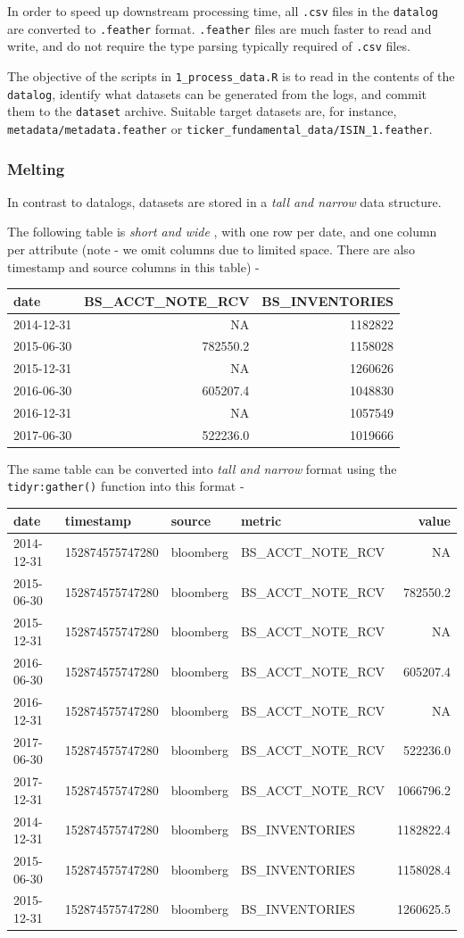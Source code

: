 \documentclass[11pt,preprint, authoryear]{elsarticle}
\numberwithin{equation}{section}
\numberwithin{figure}{section}
\numberwithin{table}{section}
\begin{document}
In order to speed up downstream processing time, all \texttt{.csv} files
in the \texttt{datalog} are converted to \texttt{.feather} format.
\texttt{.feather} files are much faster to read and write, and do not
require the type parsing typically required of \texttt{.csv} files.

The objective of the scripts in \texttt{1\_process\_data.R} is to read
in the contents of the \texttt{datalog}, identify what datasets can be
generated from the logs, and commit them to the \texttt{dataset}
archive. Suitable target datasets are, for instance,
\texttt{metadata/metadata.feather} or
\texttt{ticker\_fundamental\_data/ISIN\_1.feather}.

\subsubsection{Melting}\label{melting}

In contrast to datalogs, datasets are stored in a \emph{tall and narrow}
data structure.

The following table is \emph{short and wide} , with one row per date,
and one column per attribute (note - we omit columns due to limited
space. There are also timestamp and source columns in this table) -

\begin{longtable}[]{@{}lrr@{}}
\toprule
date & BS\_ACCT\_NOTE\_RCV & BS\_INVENTORIES\tabularnewline
\midrule
\endhead
2014-12-31 & NA & 1182822\tabularnewline
2015-06-30 & 782550.2 & 1158028\tabularnewline
2015-12-31 & NA & 1260626\tabularnewline
2016-06-30 & 605207.4 & 1048830\tabularnewline
2016-12-31 & NA & 1057549\tabularnewline
2017-06-30 & 522236.0 & 1019666\tabularnewline
\bottomrule
\end{longtable}

The same table can be converted into \emph{tall and narrow} format using
the \texttt{tidyr:gather()} function into this format -

\begin{longtable}[]{@{}llllr@{}}
\toprule
date & timestamp & source & metric & value\tabularnewline
\midrule
\endhead
2014-12-31 & 152874575747280 & bloomberg & BS\_ACCT\_NOTE\_RCV &
NA\tabularnewline
2015-06-30 & 152874575747280 & bloomberg & BS\_ACCT\_NOTE\_RCV &
782550.2\tabularnewline
2015-12-31 & 152874575747280 & bloomberg & BS\_ACCT\_NOTE\_RCV &
NA\tabularnewline
2016-06-30 & 152874575747280 & bloomberg & BS\_ACCT\_NOTE\_RCV &
605207.4\tabularnewline
2016-12-31 & 152874575747280 & bloomberg & BS\_ACCT\_NOTE\_RCV &
NA\tabularnewline
2017-06-30 & 152874575747280 & bloomberg & BS\_ACCT\_NOTE\_RCV &
522236.0\tabularnewline
2017-12-31 & 152874575747280 & bloomberg & BS\_ACCT\_NOTE\_RCV &
1066796.2\tabularnewline
2014-12-31 & 152874575747280 & bloomberg & BS\_INVENTORIES &
1182822.4\tabularnewline
2015-06-30 & 152874575747280 & bloomberg & BS\_INVENTORIES &
1158028.4\tabularnewline
2015-12-31 & 152874575747280 & bloomberg & BS\_INVENTORIES &
1260625.5\tabularnewline
\bottomrule
\end{longtable}
\end{document}
